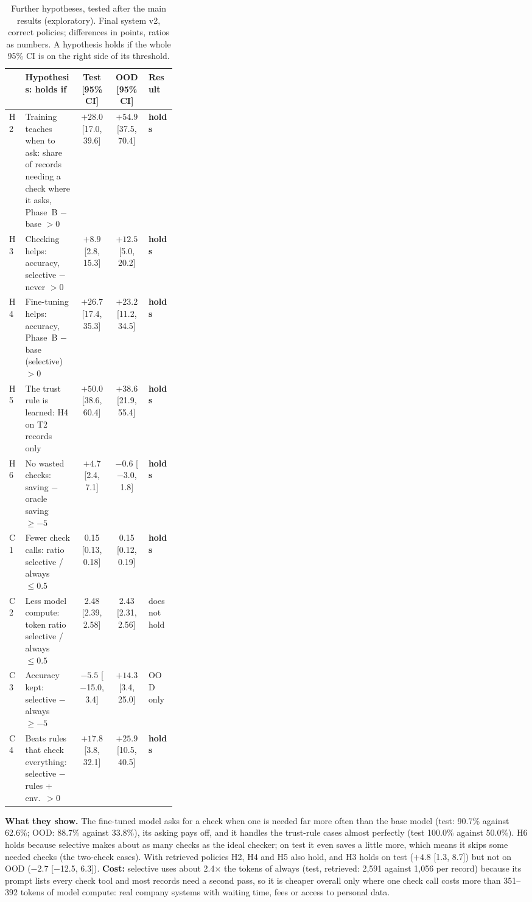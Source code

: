 \documentclass[10pt]{article}
\newcommand{\ci}[2]{[#1, #2]}
\begin{document}
\begin{table}[h]
\centering\footnotesize
\setlength{\tabcolsep}{4pt}
\begin{tabular}{@{}lL{0.32\linewidth}ccl@{}}
\toprule
 & \textbf{Hypothesis: holds if} & \textbf{Test} [95\% CI] & \textbf{OOD} [95\% CI] & \textbf{Result}\\
\midrule
H2 & Training teaches when to ask: share of records needing a check where it asks, Phase~B $-$ base $>0$ & $+28.0$ \ci{17.0}{39.6} & $+54.9$ \ci{37.5}{70.4} & \textbf{holds}\\
H3 & Checking helps: accuracy, selective $-$ never $>0$ & $+8.9$ \ci{2.8}{15.3} & $+12.5$ \ci{5.0}{20.2} & \textbf{holds}\\
H4 & Fine-tuning helps: accuracy, Phase~B $-$ base (selective) $>0$ & $+26.7$ \ci{17.4}{35.3} & $+23.2$ \ci{11.2}{34.5} & \textbf{holds}\\
H5 & The trust rule is learned: H4 on T2 records only & $+50.0$ \ci{38.6}{60.4} & $+38.6$ \ci{21.9}{55.4} & \textbf{holds}\\
H6 & No wasted checks: saving $-$ oracle saving $\ge -5$ & $+4.7$ \ci{2.4}{7.1} & $-0.6$ \ci{$-$3.0}{1.8} & \textbf{holds}\\
\midrule
C1 & Fewer check calls: ratio selective / always $\le 0.5$ & 0.15 \ci{0.13}{0.18} & 0.15 \ci{0.12}{0.19} & \textbf{holds}\\
C2 & Less model compute: token ratio selective / always $\le 0.5$ & 2.48 \ci{2.39}{2.58} & 2.43 \ci{2.31}{2.56} & does not hold\\
C3 & Accuracy kept: selective $-$ always $\ge -5$ & $-5.5$ \ci{$-$15.0}{3.4} & $+14.3$ \ci{3.4}{25.0} & OOD only\\
C4 & Beats rules that check everything: selective $-$ rules + env.\ $>0$ & $+17.8$ \ci{3.8}{32.1} & $+25.9$ \ci{10.5}{40.5} & \textbf{holds}\\
\bottomrule
\end{tabular}
\caption{Further hypotheses, tested after the main results (exploratory). Final system v2, correct policies;
differences in points, ratios as numbers. A hypothesis holds if the whole 95\% CI is on the right side of its
threshold.}
\label{tab:more}
\end{table}

\textbf{What they show.} The fine-tuned model asks for a check when one is needed far more often than the
base model (test: 90.7\% against 62.6\%; OOD: 88.7\% against 33.8\%), its asking pays off, and it handles
the trust-rule cases almost perfectly (test 100.0\% against 50.0\%). H6 holds because selective makes about as many checks as the ideal checker; on
test it even saves a little more, which means it skips some needed checks (the two-check cases). With
retrieved policies H2, H4 and H5 also hold, and H3 holds on test ($+4.8$ \ci{1.3}{8.7}) but not on OOD
($-2.7$ \ci{$-$12.5}{6.3}). \textbf{Cost:} selective uses about 2.4$\times$ the tokens of always (test,
retrieved: 2,591 against 1,056 per record) because its prompt lists every check tool and most records need a
second pass, so it is cheaper overall only where one check call costs more than 351--392 tokens of model
compute: real company systems with waiting time, fees or access to personal data.
\end{document}
